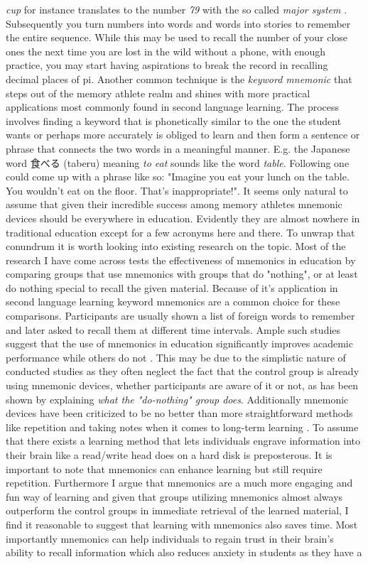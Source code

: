 \emph{cup} for instance translates to the number \emph{79} with the so called \emph{major system} \cite{major_system}. Subsequently you turn numbers into words and words into stories to remember the entire sequence. While this may be used to recall the number of your close ones the next time you are lost in the wild without a phone, with enough practice, you may start having aspirations to break the record in recalling decimal places of pi. Another common technique is the \emph{keyword mnemonic} that steps out of the memory athlete realm and shines with more practical applications most commonly found in second language learning. The process involves finding a keyword that is phonetically similar to the one the student wants or perhaps more accurately is obliged to learn and then form a sentence or phrase that connects the two words in a meaningful manner. E.g. the Japanese word 食べる (taberu) meaning \emph{to eat} sounds like the word \emph{table}. Following one could come up with a phrase like so: "Imagine you eat your lunch on the table. You wouldn't eat on the floor. That's inappropriate!". It seems only natural to assume that given their incredible success among memory athletes mnemonic devices should be everywhere in education. Evidently they are almost nowhere in traditional education except for a few acronyms here and there. To unwrap that conundrum it is worth looking into existing research on the topic. Most of the research I have come across tests the effectiveness of mnemonics in education by comparing groups that use mnemonics with groups that do "nothing", or at least do nothing special to recall the given material. Because of it's application in second language learning keyword mnemonics are a common choice for these comparisons. Participants are usually shown a list of foreign words to remember and later asked to recall them at different time intervals. Ample such studies suggest that the use of mnemonics in education significantly improves academic performance while others do not \cite{putnam_2015}. This may be due to the simplistic nature of conducted studies as they often neglect the fact that the control group is already using mnemonic devices, whether participants are aware of it or not, as has been shown by \cite{the_do_nothing_group} explaining \emph{what the "do-nothing" group does}. Additionally mnemonic devices have been criticized to be no better than more straightforward methods like repetition and taking notes when it comes to long-term learning \cite{putnam_2015}. To assume that there exists a learning method that lets individuals engrave information into their brain like a read/write head does on a hard disk is preposterous. It is important to note that mnemonics can enhance learning but still require repetition. Furthermore I argue that mnemonics are a much more engaging and fun way of learning and given that groups utilizing mnemonics almost always outperform the control groups in immediate retrieval \cite{putnam_2015} of the learned material, I find it reasonable to suggest that learning with mnemonics also saves time. Most importantly mnemonics can help individuals to regain trust in their brain's ability to recall information which also reduces anxiety in students as they have a 